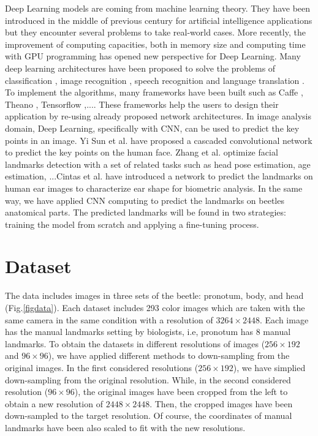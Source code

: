 \documentclass[12pt,a4paper]{article}
\begin{document}
Deep Learning models are coming from machine learning theory. They have been introduced in the middle of previous century for artificial intelligence applications but they encounter
several problems to take real-world cases. More recently, the
improvement of computing capacities, both in memory size
and computing time with GPU programming has opened new
perspective for Deep Learning. Many deep learning architectures have been proposed to solve the problems of classification \cite{krizhevsky2012imagenet}, image recognition \cite{simonyan2014very}, speech recognition \cite{hinton2012deep,mikolov2011strategies} and language translation \cite{jean2014using}. To implement
the algorithms, many frameworks have been built such as Caffe
\cite{jia2014caffe}, Theano \cite{2016arXiv160502688short}, Tensorflow \cite{abadi2016tensorflow},.... These frameworks help
the users to design their application by re-using already proposed network architectures. In image analysis domain, Deep
Learning, specifically with CNN, can be used to predict the key
points in an image. Yi Sun et al. \cite{sun2013deep} have proposed a cascaded
convolutional network to predict the key points on the human
face. Zhang et al. \cite{zhang2014facial} optimize facial landmarks detection
with a set of related tasks such as head pose estimation, age
estimation, ...Cintas et al. \cite{cintas2016automatic} have introduced a network to
predict the landmarks on human ear images to characterize ear
shape for biometric analysis. In the same way, we have applied CNN computing to predict the landmarks on beetles anatomical parts. The predicted landmarks will be found in two strategies: training the model from scratch and applying a fine-tuning process.
\section{Dataset}
\label{secdata}
The data includes images in three sets of the beetle: pronotum, body, and head (Fig.\ref{figdata}). Each dataset includes 293 color images which are taken with the same camera in the same
condition with a resolution of $3264 \times 2448$. Each image has
the manual landmarks setting by biologists, i.e, pronotum has $8$
manual landmarks. To obtain the datasets in different resolutions of images ($256 \times 192$ and $96 \times 96$), we have applied different methods to down-sampling from the original images. In the first considered resolutions ($256 \times 192$), we have simplied down-sampling from the original resolution. While, in the second considered resolution ($96 \times 96$), the original images have been cropped from the left to obtain a new resolution of $2448 \times 2448$. Then, the cropped images have been down-sampled to the target resolution. Of course, the coordinates of manual landmarks have been also scaled to fit with the new resolutions.
\end{document}
